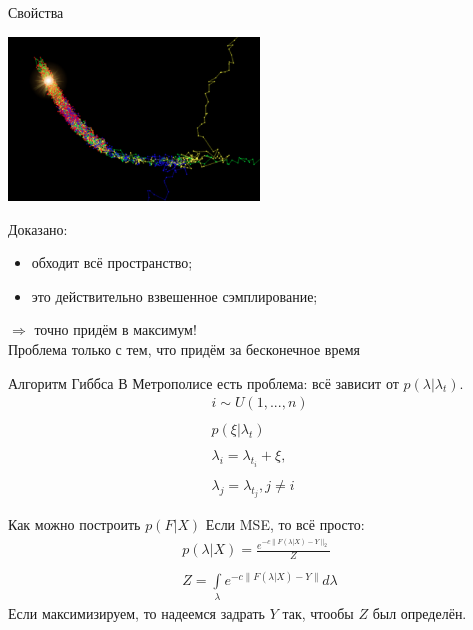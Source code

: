 \documentclass[14pt, fleqn, xcolor={dvipsnames, table}]{beamer}
\begin{document}
\begin{frame}{Свойства}
\begin{center}
\includegraphics[width=0.5\textwidth]{mcmc.png}
\end{center}
\footnotesize
Доказано:
\begin{itemize}
  \item обходит всё пространство;
  \item это действительно взвешенное сэмплирование;
\end{itemize}
$\Rightarrow$ точно придём в максимум! \\
Проблема только с тем, что придём за бесконечное время
\end{frame}

\begin{frame}{Алгоритм Гиббса}
В Метрополисе есть проблема: всё зависит от $p(\lambda|\lambda_t)$.
$$\begin{array}{l}
i \sim U(1, ..., n) \\
\\
p(\xi|\lambda_t) \\
\\
\lambda_i = \lambda_{t_i} + \xi, \\
\\
\lambda_j = \lambda_{t_j}, j \neq i
\end{array}$$
\end{frame}

\begin{frame}{Как можно построить $p(F|X)$}
Если MSE, то всё просто:
$$\begin{array}{l}
p(\lambda|X) = \frac{e^{-c\|F(\lambda|X) - Y\|_2}}{Z} \\
\\
Z = \int\limits_{\lambda} e^{-c\|F(\lambda|X) - Y\|}d\lambda
\end{array}$$
Если максимизируем, то надеемся задрать $Y$ так, чтообы $Z$ был определён. 
\end{frame}
\end{document}
